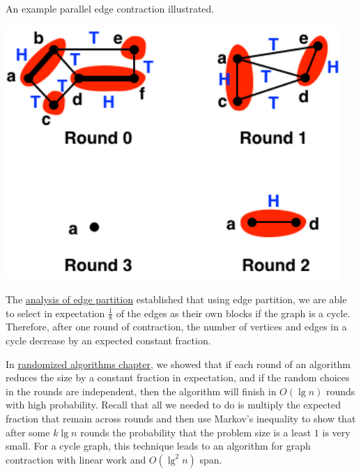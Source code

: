 \begin{example}
\label{ex:graphcon::edge::contraction::ex1}

An example parallel edge contraction illustrated.

\begin{center}
\includegraphics[width=5in]{./graph-contraction/media-edge/edge-contraction-example.jpg}
\end{center}
\end{example}

\begin{gram}
The
\href{sec:graphcon::edge::analysis::star}{analysis of edge partition} 
established that using edge partition, we are able to select in
expectation $\frac{1}{8}$ of the edges as their own blocks if the
graph is a cycle.
%
Therefore, after one round of contraction, the number of vertices and
edges in a cycle decrease by an expected constant fraction.
%

In 
%
\href{ch:randomization::select}{randomized algorithms chapter}, 
%
we showed that if each round of an algorithm reduces the size by a
constant fraction in expectation, and if the random choices in the
rounds are independent, then the algorithm will finish in $O(\lg n)$
rounds with high probability. 
%
Recall that all we needed to do is multiply the expected fraction that
remain across rounds and then use Markov's inequality to show that
after some $k \lg n$ rounds the probability that the problem size is a
least $1$ is very small.  
%
For a cycle graph, this technique leads to an
algorithm for graph contraction with linear work and $O(\lg^2{n})$
span.
\end{gram}

